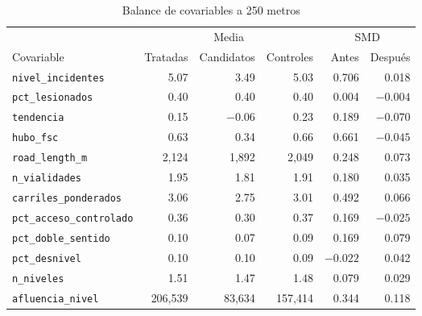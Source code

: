 \begin{table}[htbp]
    \centering
    \caption{Balance de covariables a 250 metros}
    \label{tab:balance-250}
    \footnotesize
    \setlength{\tabcolsep}{4pt}
    \begin{tabular}{l r r r r r}
        \toprule
        & \multicolumn{3}{c}{Media} & \multicolumn{2}{c}{SMD} \\
        \cmidrule(lr){2-4} \cmidrule(lr){5-6}
        Covariable & Tratadas & Candidatos & Controles & Antes & Después \\
        \midrule
        \texttt{nivel\_incidentes} & 5.07 & 3.49 & 5.03 & 0.706 & 0.018 \\
        \texttt{pct\_lesionados} & 0.40 & 0.40 & 0.40 & 0.004 & $-0.004$ \\
        \texttt{tendencia} & 0.15 & $-0.06$ & 0.23 & 0.189 & $-0.070$ \\
        \texttt{hubo\_fsc} & 0.63 & 0.34 & 0.66 & 0.661 & $-0.045$ \\
        \texttt{road\_length\_m} & 2,124 & 1,892 & 2,049 & 0.248 & 0.073 \\
        \texttt{n\_vialidades} & 1.95 & 1.81 & 1.91 & 0.180 & 0.035 \\
        \texttt{carriles\_ponderados} & 3.06 & 2.75 & 3.01 & 0.492 & 0.066 \\
        \texttt{pct\_acceso\_controlado} & 0.36 & 0.30 & 0.37 & 0.169 & $-0.025$ \\
        \texttt{pct\_doble\_sentido} & 0.10 & 0.07 & 0.09 & 0.169 & 0.079 \\
        \texttt{pct\_desnivel} & 0.10 & 0.10 & 0.09 & $-0.022$ & 0.042 \\
        \texttt{n\_niveles} & 1.51 & 1.47 & 1.48 & 0.079 & 0.029 \\
        \texttt{afluencia\_nivel} & 206,539 & 83,634 & 157,414 & 0.344 & 0.118 \\
        \bottomrule
    \end{tabular}
\end{table}
